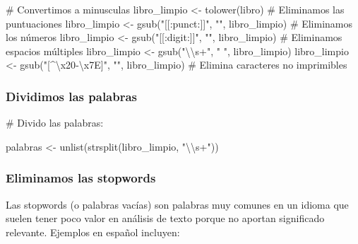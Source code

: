 \documentclass[
  letterpaper,
  DIV=11,
  numbers=noendperiod]{scrreprt}
\newenvironment{Shaded}{\begin{snugshade}}{\end{snugshade}}
\newcommand{\CommentTok}[1]{\textcolor[rgb]{0.37,0.37,0.37}{#1}}
\newcommand{\FunctionTok}[1]{\textcolor[rgb]{0.28,0.35,0.67}{#1}}
\newcommand{\NormalTok}[1]{\textcolor[rgb]{0.00,0.23,0.31}{#1}}
\newcommand{\OtherTok}[1]{\textcolor[rgb]{0.00,0.23,0.31}{#1}}
\newcommand{\SpecialCharTok}[1]{\textcolor[rgb]{0.37,0.37,0.37}{#1}}
\newcommand{\StringTok}[1]{\textcolor[rgb]{0.13,0.47,0.30}{#1}}
\begin{document}
\begin{Shaded}
\begin{Highlighting}[]
\CommentTok{\# Convertimos a minusculas}
\NormalTok{libro\_limpio }\OtherTok{\textless{}{-}} \FunctionTok{tolower}\NormalTok{(libro)  }
\CommentTok{\# Eliminamos las puntuaciones}
\NormalTok{libro\_limpio }\OtherTok{\textless{}{-}} \FunctionTok{gsub}\NormalTok{(}\StringTok{"[[:punct:]]"}\NormalTok{, }\StringTok{""}\NormalTok{, libro\_limpio)  }
\CommentTok{\# Eliminamos los números}
\NormalTok{libro\_limpio }\OtherTok{\textless{}{-}} \FunctionTok{gsub}\NormalTok{(}\StringTok{"[[:digit:]]"}\NormalTok{, }\StringTok{""}\NormalTok{, libro\_limpio) }
\CommentTok{\# Eliminamos espacios múltiples}
\NormalTok{libro\_limpio }\OtherTok{\textless{}{-}} \FunctionTok{gsub}\NormalTok{(}\StringTok{"}\SpecialCharTok{\textbackslash{}\textbackslash{}}\StringTok{s+"}\NormalTok{, }\StringTok{" "}\NormalTok{, libro\_limpio) }
\NormalTok{libro\_limpio }\OtherTok{\textless{}{-}} \FunctionTok{gsub}\NormalTok{(}\StringTok{"[\^{}}\SpecialCharTok{\textbackslash{}x20}\StringTok{{-}}\SpecialCharTok{\textbackslash{}x7E}\StringTok{]"}\NormalTok{, }\StringTok{""}\NormalTok{, libro\_limpio)  }\CommentTok{\# Elimina caracteres no imprimibles}
\end{Highlighting}
\end{Shaded}

\subsubsection{Dividimos las palabras}\label{dividimos-las-palabras}

\begin{Shaded}
\begin{Highlighting}[]
\CommentTok{\# Divido las palabras:}

\NormalTok{palabras }\OtherTok{\textless{}{-}} \FunctionTok{unlist}\NormalTok{(}\FunctionTok{strsplit}\NormalTok{(libro\_limpio, }\StringTok{"}\SpecialCharTok{\textbackslash{}\textbackslash{}}\StringTok{s+"}\NormalTok{)) }
\end{Highlighting}
\end{Shaded}

\subsubsection{Eliminamos las stopwords}\label{eliminamos-las-stopwords}

Las stopwords (o palabras vacías) son palabras muy comunes en un idioma
que suelen tener poco valor en análisis de texto porque no aportan
significado relevante. Ejemplos en español incluyen:
\end{document}
